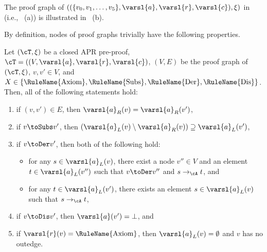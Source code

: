 \begin{example}
	The proof graph of $((\{v_0,v_1,\ldots,v_5\},\varsl{a},\varsl{r},\varsl{c}),\xi)$ in  (i.e., ~(a)) is illustrated in ~(b).
\end{example}

By definition, nodes of proof graphs trivially have the following properties.
\begin{proposition}
	\label{prop:basic-properties-of-proof-graphs}
	Let $(\cT,\xi)$ be a closed APR pre-proof,
	$\cT= ((V,\varsl{a},\varsl{r},\varsl{c})$,
	$(V,E)$ be the proof graph of $(\cT,\xi)$,
	$v,v' \in V$,
	and
	$X \in  \{ \mbox{\rm\RuleName{Axiom}}, \mbox{\rm\RuleName{Subs}}, \mbox{\rm\RuleName{Der}}, \mbox{\rm\RuleName{Dis}} \}$.
	Then, all of the following statements hold:
	\begin{enumerate}
		\renewcommand{\labelenumi}{(\arabic{enumi})}
		\leftskip=1ex
		\item if $(v,v') \in E$, then $\varsl{a}_R(v) = \varsl{a}_R(v')$,
		\item if $v \toSubs v'$, then $(\varsl{a}_L(v) \setminus \varsl{a}_R(v)) \supseteq \varsl{a}_L(v')$,
		\item if $v \toDer v'$, then both of the following hold:
		      \begin{itemize}
			      \item for any $s \in \varsl{a}_L(v)$, there exist a node $v'' \in V$ and an element $t \in \varsl{a}_L(v'')$ such that
			            $v \toDer v''$ and $s \to_\cA t$,
			            and
			      \item for any $t \in \varsl{a}_L(v')$, there exists an element $s \in \varsl{a}_L(v)$ such that $s \to_\cA t$,
		      \end{itemize}
		\item if $v \toDis v'$, then $\varsl{a}(v') = \bot$,
		      and
		\item if $\varsl{r}(v) = \mbox{\rm\RuleName{Axiom}}$, then
		      $\varsl{a}_L(v) = \emptyset$ and $v$ has no outedge.
	\end{enumerate}
\end{proposition}


